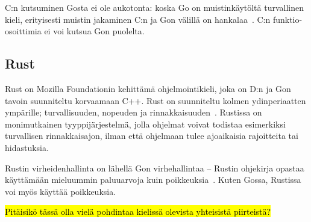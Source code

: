 C:n kutsuminen Gosta ei ole aukotonta: koska Go on muistinkäytöltä turvallinen
kieli, erityisesti muistin jakaminen C:n ja Gon välillä on
hankalaa~\citationneeded. C:n funktio-osoittimia ei voi kutsua Gon puolelta.

\subsection{Rust}

Rust on Mozilla Foundationin kehittämä ohjelmointikieli, joka on D:n ja Gon
tavoin suunniteltu korvaamaan C++. Rust on suunniteltu kolmen ydinperiaatten
ympärille; turvallisuuden, nopeuden ja rinnakkaisuuden~\citationneeded.
Rustissa on monimutkainen tyyppijärjestelmä, jolla ohjelmat voivat todistaa
esimerkiksi turvallisen rinnakkaisajon, ilman että ohjelmaan tulee ajoaikaisia
rajoitteita tai hidastuksia.

Rustin virheidenhallinta on lähellä Gon virhehallintaa -- Rustin ohjekirja
opastaa käyttämään mieluummin paluuarvoja kuin poikkeuksia~\citationneeded.
Kuten Gossa, Rustissa voi myös käyttää poikkeuksia.

\hl{Pitäisikö tässä olla vielä pohdintaa kielissä olevista yhteisistä
piirteistä?}
